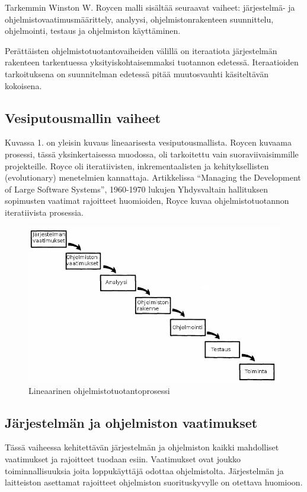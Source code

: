 \documentclass[finnish]{tktltiki2}
\theoremstyle{definition}
\theoremstyle{remark}
\begin{document}
Tarkemmin Winston W. Roycen malli sisältää seuraavat vaiheet: järjestelmä- ja ohjelmistovaatimusmäärittely, analyysi, ohjelmistonrakenteen suunnittelu, ohjelmointi, testaus ja ohjelmiston käyttäminen\cite{ROY70}. 

Perättäisten ohjelmistotuotantovaiheiden välillä on iteraatiota järjestelmän rakenteen tarkentuessa yksityiskohtaisemmaksi tuotannon edetessä. Iteraatioiden tarkoituksena on suunnitelman edetessä pitää muutosvauhti käsiteltävän kokoisena\cite{ROY70}.

\subsection{Vesiputousmallin vaiheet}

Kuvassa 1. on yleisin kuvaus lineaarisesta vesiputousmallista. Roycen kuvaama prosessi, tässä yksinkertaisessa muodossa, oli tarkoitettu vain suoraviivaisimmille projekteille. Royce oli iteratiivisten, inkrementaalisten ja kehityksellisten (evolutionary) menetelmien kannattaja. Artikkelissa “Managing the Development of Large Software Systems”, 1960-1970 lukujen Yhdysvaltain hallituksen sopimusten vaatimat rajoitteet huomioiden, Royce kuvaa ohjelmistotuotannon iteratiivista prosessia\cite{LAB03}. 

\begin{figure}[h!]
  \caption{Lineaarinen ohjelmistotuotantoprosessi}
  \centering
    \includegraphics[width=\textwidth]{waterfall}
\end{figure}

\subsection*{Järjestelmän ja ohjelmiston vaatimukset}
Tässä vaiheessa kehitettävän järjestelmän ja ohjelmiston kaikki mahdolliset vaatimukset ja rajoitteet tuodaan esiin. Vaatimukset ovat joukko toiminnallisuuksia joita loppukäyttäjä odottaa ohjelmistolta. Järjestelmän ja laitteiston asettamat rajoitteet ohjelmiston suorituskyvylle on otettava huomioon.
\end{document}
